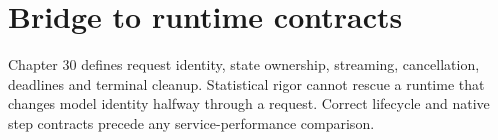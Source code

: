 \section{Bridge to runtime contracts}
Chapter 30 defines request identity, state ownership, streaming, cancellation,
deadlines and terminal cleanup. Statistical rigor cannot rescue a runtime that
changes model identity halfway through a request. Correct lifecycle and native
step contracts precede any service-performance comparison.
